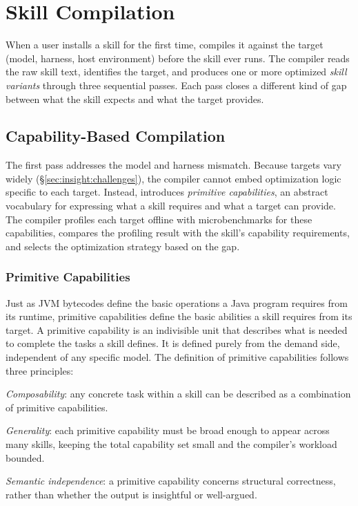 \section{Skill Compilation}
\label{sec:compiler}

When a user installs a skill for the first time, \sys compiles it against the target (model, harness, host environment) before the skill ever runs.
The compiler reads the raw skill text, identifies the target,
and produces one or more optimized \emph{skill variants} through three sequential passes.
Each pass closes a different kind of gap between what the skill expects and what the target provides.

\subsection{Capability-Based Compilation}
\label{sec:compiler:cap}

The first pass addresses the model and harness mismatch.
Because targets vary widely (\S\ref{sec:insight:challenges}),
the compiler cannot embed optimization logic specific to each target.
Instead, \sys introduces \emph{primitive capabilities},
an abstract vocabulary for expressing what a skill requires and what a target can provide.
The compiler profiles each target offline with microbenchmarks for these capabilities,
compares the profiling result with the skill's capability requirements,
and selects the optimization strategy based on the gap.

\subsubsection{Primitive Capabilities}

Just as JVM bytecodes define the basic operations a Java program requires from its runtime,
primitive capabilities define the basic abilities a skill requires from its target.
A primitive capability is an indivisible unit that describes what is needed to complete the tasks a skill defines.
It is defined purely from the demand side, independent of any specific model.
The definition of primitive capabilities follows three principles:
\begin{myitemize}
  \item \emph{Composability}: any concrete task within a skill can
    be described as a combination of primitive capabilities.
  \item \emph{Generality}: each primitive capability must be broad
    enough to appear across many skills, keeping the total
    capability set small and the compiler's workload bounded.
  \item \emph{Semantic independence}: a primitive capability concerns structural correctness,
  rather than whether the output is insightful or well-argued.
\end{myitemize}

